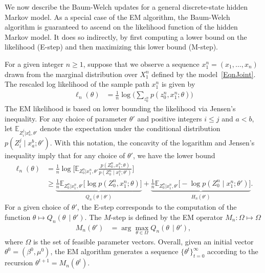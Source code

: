 \documentclass[twoside,11pt]{article}
\newcommand{\numobs}{\ensuremath{n}}
\def\EE{ \mathbb{E} }
\newcommand{\EEzcondx}[3]{\ensuremath{\EE_{#1|#2,#3}}}
\newcommand{\paramobs}{\mu}
\newcommand{\paramtrans}{\beta}
\newcommand{\paramjoint}{\theta}
\newcommand{\paramtransit}[1]{\ensuremath{\paramtrans^{#1}}}
\newcommand{\paramobsit}[1]{\ensuremath{\paramobs^{#1}}}
\newcommand{\paramjointit}[1]{\ensuremath{\theta^{#1}}}
\newcommand{\MFUNSAM}{\ensuremath{M_\numobs}}
\newcommand{\LikeSample}{\ensuremath{\ell_\numobs}}
\newcommand{\hprob}{\ensuremath{p}}
\newcommand{\QFUNSAM}[2]{\ensuremath{Q_\numobs (#1 \, \mid #2)}}
\newcommand{\DomTheta}{\ensuremath{\Omega}}
\begin{document}
We now describe the Baum-Welch updates for a general discrete-state
hidden Markov model.  As a special case of the EM algorithm, the
Baum-Welch algorithm is guaranteed to ascend on the
likelihood function of the hidden Markov model.  It does so
indirectly, by first computing a lower bound on the likelihood
(E-step) and then maximizing this lower bound (M-step).


For a given integer $\numobs \geq 1$, suppose that we observe a
sequence $x_1^\numobs = (x_1, \ldots, x_\numobs)$ drawn from the
marginal distribution over $X_1^\numobs$ defined by the
model~\eqref{EqnJoint}. The rescaled log likelihood of the sample path
$x_1^\numobs$ is given by
\begin{align*}
\LikeSample(\paramjoint) & = \frac{1}{\numobs} \log
\Big(\sum_{z_0^\numobs} \hprob(z_0^\numobs, x_1^\numobs; \paramjoint)
\Big)
\end{align*}
The EM likelihood is based on lower bounding the likelihood via
Jensen's inequality.  For any choice of parameter
$\paramjoint'$ and positive integers $i\leq j$ and $a<b$, let
$\EEzcondx{Z_i^{j}}{x_a^b}{\paramjoint'}$  denote the
expectation under the conditional distribution $p(Z_i^j \mid
x_a^b; \paramjoint')$.  With this notation, the concavity of the
logarithm and Jensen's inequality imply that for any choice of
$\paramjoint'$, we have the lower bound
\begin{align*}
\LikeSample(\paramjoint) &= \frac{1}{\numobs} \log  \big[
\EEzcondx{Z_0^{\numobs}}{x_1^{\numobs}}{\paramjoint'}
\frac{p(Z_0^{\numobs}, x_1^{\numobs}; \paramjoint)}{p(Z_0^{\numobs} \mid x_1^{\numobs}; \paramjoint') } \big] \\
 &\geq \underbrace{\frac{1}{\numobs}
  \EEzcondx{Z_0^{\numobs}}{x_1^\numobs}{\paramjoint'} \big[ \log p(Z_0^\numobs,x_1^\numobs;
    \paramjoint) \big]}_{\QFUNSAM{\paramjoint}{\paramjoint'}} +
\underbrace{\frac{1}{\numobs} \EEzcondx{Z_0^{\numobs}}{x_1^\numobs}{\paramjoint'} \big[ -\log
    p(Z_0^\numobs \mid x_1^\numobs;
    \paramjoint')]}_{H_\numobs(\paramjoint')}.
\end{align*}
For a given choice of $\paramjoint'$, the E-step corresponds to the
computation of the function \mbox{$\paramjoint \mapsto
  \QFUNSAM{\paramjoint}{\paramjoint'}$.}  The $M$-step is defined by
the EM operator $\MFUNSAM: \DomTheta \mapsto \DomTheta$
\begin{align}
\label{EqnEMOperator}
\MFUNSAM(\paramjoint') & = \arg \max_{\theta \in \DomTheta}
\QFUNSAM{\paramjoint}{\paramjoint'},
\end{align}
where $\DomTheta$ is the set of feasible parameter vectors.  Overall,
given an initial vector $\paramjointit{0} = (\paramtransit{0},
\paramobsit{0})$, the EM algorithm generates a sequence
$\{\paramjointit{t}\}_{t=0}^\infty$ according to the recursion
$\paramjointit{t+1} = \MFUNSAM(\paramjointit{t})$.
\end{document}
